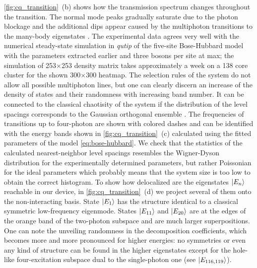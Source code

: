 \documentclass[%
 aps, prl,
 amsmath,amssymb,
 reprint,%
superscriptaddress
]{revtex4-2}
\begin{document}
\autoref{fig:cq_transition}~(b) shows how the transmission spectrum changes throughout the transition. The normal mode peaks gradually saturate due to the photon blockage and the additional dips appear caused by the multiphoton transitions to the many-body eigenstates \cite{Biella2015,PhysRevA.102.013707,roberts2020driven}. The experimental data agrees very well with the numerical steady-state simulation in \textit{qutip} \cite{qutip1, qutip2} of the five-site Bose-Hubbard model with the parameters extracted earlier and three bosons per site at max; the simulation of 253$\times$253 density matrix takes approximately a week on a 138 core cluster for the shown 300$\times$300 heatmap. The selection rules of the system do not allow all possible multiphoton lines, but one can clearly discern an increase of the density of states and their randomness with increasing band number. It can be connected to the classical chaotisity of the system if the distribution of the level spacings corresponds to the Gaussian orthogonal ensemble \cite{bohigas1984characterization,zimmermann1986manifestation, livan2018introduction}. The frequencies of transitions up to four-photon are shown with colored dashes and can be identified with the energy bands shown in \autoref{fig:cq_transition}~(c) calculated using the fitted parameters of the model \autoref{eq:bose-hubbard}. We check that the statistics of the calculated nearest-neighbor level spacings resembles the Wigner-Dyson distribution for the experimentally determined parameters, but rather Poissonian for the ideal parameters which probably means that the system size is too low to obtain the correct histogram. To show how delocalized are the eigenstates $ \ket{E_n} $ reachable in our device, in \autoref{fig:cq_transition}~(d) we project several of them onto the non-interacting basis. State $\ket{E_1}$ has the structure identical to a classical symmetric low-frequency eigenmode. States $\ket{E_{11}}$ and $\ket{E_{20}}$ are at the edges of the orange band of the two-photon subspace and are much larger superpositions. One can note the unveiling randomness in the decomposition coefficients, which becomes more and more pronounced for higher energies: no symmetries or even any kind of structure can be found in the higher eigenstates except for the hole-like four-excitation subspace dual to the single-photon one (see $\ket{E_{116, 119}}$). 
\end{document}
